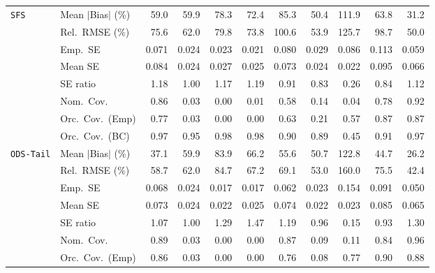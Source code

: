 \begin{landscape}
\begin{longtable}{llrrrrrrrrr}
\quad \texttt{SFS} & Mean $|$Bias$|$ (\%) & \cellcolor{rankthree}59.0 & 59.9 & 78.3 & 72.4 & 85.3 & \cellcolor{ranktwo}50.4 & 111.9 & 63.8 & \cellcolor{rankone}31.2 \\
 & Rel.\ RMSE (\%) & 75.6 & \cellcolor{rankthree}62.0 & 79.8 & 73.8 & 100.6 & \cellcolor{ranktwo}53.9 & 125.7 & 98.7 & \cellcolor{rankone}50.0 \\
 & Emp.\ SE & 0.071 & 0.024 & 0.023 & 0.021 & 0.080 & 0.029 & 0.086 & 0.113 & 0.059 \\
 & Mean SE & 0.084 & 0.024 & 0.027 & 0.025 & 0.073 & 0.024 & 0.022 & 0.095 & 0.066 \\
 & SE ratio & 1.18 & \cellcolor{rankone}1.00 & 1.17 & 1.19 & \cellcolor{ranktwo}0.91 & 0.83 & 0.26 & 0.84 & \cellcolor{rankthree}1.12 \\
 & Nom.\ Cov. & \cellcolor{ranktwo}0.86 & 0.03 & 0.00 & 0.01 & 0.58 & 0.14 & 0.04 & \cellcolor{rankthree}0.78 & \cellcolor{rankone}0.92 \\
 & Orc.\ Cov.\ (Emp) & \cellcolor{ranktwo}0.77 & 0.03 & 0.00 & 0.00 & \cellcolor{rankthree}0.63 & 0.21 & 0.57 & \cellcolor{rankone}0.87 & \cellcolor{rankone}0.87 \\
 & Orc.\ Cov.\ (BC) & \cellcolor{ranktwo}0.97 & \cellcolor{rankone}0.95 & \cellcolor{rankthree}0.98 & \cellcolor{rankthree}0.98 & 0.90 & 0.89 & 0.45 & 0.91 & \cellcolor{ranktwo}0.97 \\
\addlinespace[2pt]
\quad \texttt{ODS-Tail} & Mean $|$Bias$|$ (\%) & \cellcolor{ranktwo}37.1 & 59.9 & 83.9 & 66.2 & 55.6 & 50.7 & 122.8 & \cellcolor{rankthree}44.7 & \cellcolor{rankone}26.2 \\
 & Rel.\ RMSE (\%) & \cellcolor{rankthree}58.7 & 62.0 & 84.7 & 67.2 & 69.1 & \cellcolor{ranktwo}53.0 & 160.0 & 75.5 & \cellcolor{rankone}42.4 \\
 & Emp.\ SE & 0.068 & 0.024 & 0.017 & 0.017 & 0.062 & 0.023 & 0.154 & 0.091 & 0.050 \\
 & Mean SE & 0.073 & 0.024 & 0.022 & 0.025 & 0.074 & 0.022 & 0.023 & 0.085 & 0.065 \\
 & SE ratio & \cellcolor{rankthree}1.07 & \cellcolor{rankone}1.00 & 1.29 & 1.47 & 1.19 & \cellcolor{ranktwo}0.96 & 0.15 & \cellcolor{rankthree}0.93 & 1.30 \\
 & Nom.\ Cov. & \cellcolor{ranktwo}0.89 & 0.03 & 0.00 & 0.00 & \cellcolor{rankthree}0.87 & 0.09 & 0.11 & 0.84 & \cellcolor{rankone}0.96 \\
 & Orc.\ Cov.\ (Emp) & \cellcolor{rankthree}0.86 & 0.03 & 0.00 & 0.00 & 0.76 & 0.08 & 0.77 & \cellcolor{rankone}0.90 & \cellcolor{ranktwo}0.88 \\

\end{longtable}
\end{landscape}
